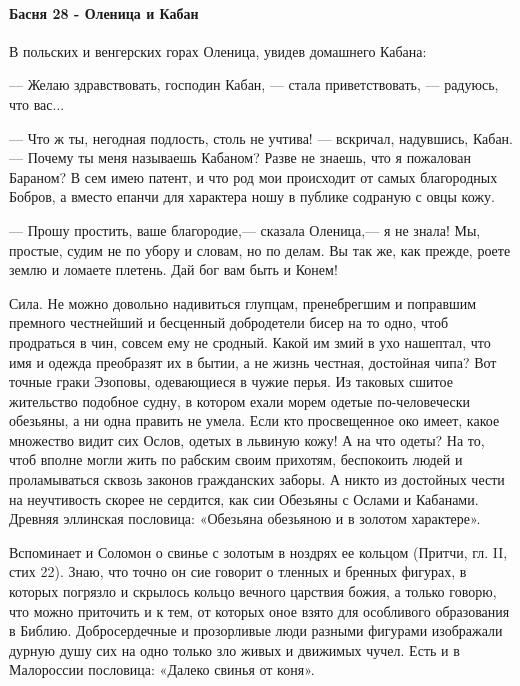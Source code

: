  
 
 
 
 

\paragraph{Басня 28 - Оленица и Кабан}

В польских и венгерских горах Оленица, увидев домашнего Кабана:

— Желаю здравствовать, господин Кабан, — стала приветствовать, — радуюсь, что
вас...

— Что ж ты, негодная подлость, столь не учтива! — вскричал, надувшись, Кабан.—
Почему ты меня называешь Кабаном? Разве не знаешь, что я пожалован Бараном? В
сем имею патент, и что род мои происходит от самых благородных Бобров, а вместо
епанчи для характера ношу в публике содраную с овцы кожу.

— Прошу простить, ваше благородие,— сказала Оленица,— я не знала! Мы, простые,
судим не по убору и словам, но по делам. Вы так же, как прежде, роете землю и
ломаете плетень. Дай бог вам быть и Конем!

Сила. Не можно довольно надивиться глупцам, пренебрегшим и поправшим премного
честнейший и бесценный добродетели бисер на то одно, чтоб продраться в чин,
совсем ему не сродный. Какой им змий в ухо нашептал, что имя и одежда
преобразят их в бытии, а не жизнь честная, достойная чипа? Вот точные граки
Эзоповы, одевающиеся в чужие перья. Из таковых сшитое жительство подобное
судну, в котором ехали морем одетые по-человечески обезьяны, а ни одна править
не умела. Если кто просвещенное око имеет, какое множество видит сих Ослов,
одетых в львиную кожу! А на что одеты? На то, чтоб вполне могли жить по рабским
своим прихотям, беспокоить людей и проламываться сквозь законов гражданских
заборы. А никто из достойных чести на неучтивость скорее не сердится, как сии
Обезьяны с Ослами и Кабанами. Древняя эллинская пословица: «Обезьяна обезьяною
и в золотом характере».

Вспоминает и Соломон о свинье с золотым в ноздрях ее кольцом (Притчи, гл. II,
стих 22). Знаю, что точно он сие говорит о тленных и бренных фигурах, в которых
погрязло и скрылось кольцо вечного царствия божия, а только говорю, что можно
приточить и к тем, от которых оное взято для особливого образования в Библию.
Добросердечные и прозорливые люди разными фигурами изображали дурную душу сих
на одно только зло живых и движимых чучел. Есть и в Малороссии пословица:
«Далеко свинья от коня». 


